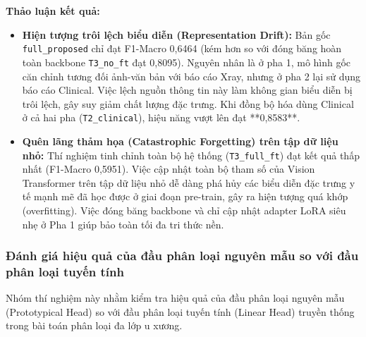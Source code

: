 \textbf{Thảo luận kết quả:}
\begin{itemize}
    \item \textbf{Hiện tượng trôi lệch biểu diễn (Representation Drift):} Bản gốc \texttt{full\_proposed} chỉ đạt F1-Macro 0,6464 (kém hơn so với đóng băng hoàn toàn backbone \texttt{T3\_no\_ft} đạt 0,8095). Nguyên nhân là ở pha 1, mô hình gốc căn chỉnh tương đối ảnh-văn bản với báo cáo Xray, nhưng ở pha 2 lại sử dụng báo cáo Clinical. Việc lệch nguồn thông tin này làm không gian biểu diễn bị trôi lệch, gây suy giảm chất lượng đặc trưng. Khi đồng bộ hóa dùng Clinical ở cả hai pha (\texttt{T2\_clinical}), hiệu năng vượt lên đạt **0,8583**.
    \item \textbf{Quên lãng thảm họa (Catastrophic Forgetting) trên tập dữ liệu nhỏ:} Thí nghiệm tinh chỉnh toàn bộ hệ thống (\texttt{T3\_full\_ft}) đạt kết quả thấp nhất (F1-Macro 0,5951). Việc cập nhật toàn bộ tham số của Vision Transformer trên tập dữ liệu nhỏ dễ dàng phá hủy các biểu diễn đặc trưng y tế mạnh mẽ đã học được ở giai đoạn pre-train, gây ra hiện tượng quá khớp (overfitting). Việc đóng băng backbone và chỉ cập nhật adapter LoRA siêu nhẹ ở Pha 1 giúp bảo toàn tối đa tri thức nền.
\end{itemize}

\subsubsection{Đánh giá hiệu quả của đầu phân loại nguyên mẫu so với đầu phân loại tuyến tính}
Nhóm thí nghiệm này nhằm kiểm tra hiệu quả của đầu phân loại nguyên mẫu (Prototypical Head) so với đầu phân loại tuyến tính (Linear Head) truyền thống trong bài toán phân loại đa lớp u xương.

\begin{table}[htbp]
\centering
{}
\end{table}

